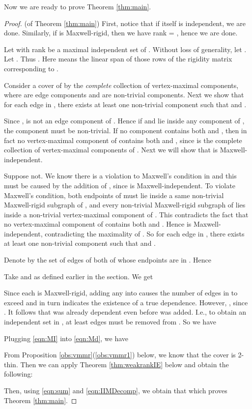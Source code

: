\documentclass[10pt]{article}
\begin{document}
Now we are ready to prove Theorem \ref{thm:main}.
\begin{proof}(of Theorem \ref{thm:main})
First, notice that if  itself is independent, we are done.
Similarly, if  is Maxwell-rigid, then we have  rank = , hence we are done. 


Let  with  rank be a maximal independent set of . Without loss of generality, let . Let . Thus   . Here  means the linear span of those rows of the rigidity matrix  corresponding to .



Consider a cover   of  by the {\em complete} collection of vertex-maximal components, where  are edge components and      are non-trivial components. Next we show that for each edge  in , there exists at least one non-trivial component  such that  and .


Since  ,    is not an edge component of . Hence if  and  lie inside any component of , the component must be non-trivial. If no component  contains both  and , then in fact no vertex-maximal component of  contains both  and , since  is the complete collection of vertex-maximal components of . Next we will show that  is Maxwell-independent.

Suppose not. We know there is a violation to Maxwell's condition in  and this must be caused by the addition of , since  is Maxwell-independent. To violate Maxwell's condition, both endpoints of  must lie inside a same non-trivial Maxwell-rigid subgraph of , and every non-trivial Maxwell-rigid subgraph of  lies inside a non-trivial vertex-maximal component of . This contradicts the fact that no vertex-maximal component of  contains both  and . Hence  is Maxwell-independent, contradicting the maximality of . So for each edge  in , there exists at least one non-trivial component  such that  and . 


Denote by  the set of edges of  both of whose endpoints are in . Hence 





Take  and  as defined earlier in the section. We get


Since each  is Maxwell-rigid, adding any  into  causes the number of edges in  to exceed  and in turn indicates the existence of a true dependence. However,    , since   . It follows that  was already dependent even before  was added. I.e., to obtain an independent set in , at least  edges must be removed from . So we have



Plugging \eqref{eqn:MI} into \eqref{eqn:Md}, we have 
 

From Proposition \ref{obs:vmmr}(\ref{obs:vmmr1}) below, we know that the cover  is 2-thin. Then we can apply Theorem \ref{thm:weakrankIE} below and obtain the following:
 
Then, using \eqref{eqn:sum} and \eqref{eqn:IIMDecomp}, we obtain that 
 which proves Theorem \ref{thm:main}. 
\end{proof}
\end{document}
